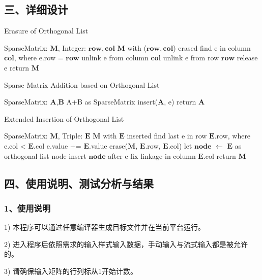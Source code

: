\documentclass[UTF8, a4paper]{ctexart}
\begin{document}
\subsection*{三、详细设计}
\begin{algorithm}[H]
\begin{algorithmic}[1]
\caption{Erasure of Orthogonal List}
\Require SparseMatrix: $\mathbf{M}$, Integer: $\mathbf{row},\mathbf{col}$
\Ensure $\mathbf{M}$ with ($\mathbf{row},\mathbf{col}$) erased
\State find e in column $\mathbf{col}$, where e.row = $\mathbf{row}$
	\State unlink e from column $\mathbf{col}$
	\State unlink e from row $\mathbf{row}$
	\State release e
\EndIf
\State return $\mathbf{M}$
\end{algorithmic}
\end{algorithm}

\begin{algorithm}[H]
\begin{algorithmic}[1]
\caption{Sparse Matrix Addition based on Orthogonal List}
\Require SparseMatrix: $\mathbf{A}$,$\mathbf{B}$
\Ensure A+B as SparseMatrix
	\State insert($\mathbf{A}$, e)
\EndFor
\State return $\mathbf{A}$
\end{algorithmic}
\end{algorithm}

\begin{algorithm}[H]
\begin{algorithmic}[1]
\caption{Extended Insertion of Orthogonal List}
\Require SparseMatrix: $\mathbf{M}$, Triple: $\mathbf{E}$
\Ensure $\mathbf{M}$ with $\mathbf{E}$ inserted
\State find last e in row $\mathbf{E}$.row, where e.col < $\mathbf{E}$.col
	\State e.value += $\mathbf{E}$.value
		\State erase($\mathbf{M}$, $\mathbf{E}$.row, $\mathbf{E}$.col)
	\EndIf
\Else
	\State let $\mathbf{node}$ $\leftarrow$ $\mathbf{E}$ as orthogonal list node
	\State insert $\mathbf{node}$ after e
	\State fix linkage in column $\mathbf{E}$.col
\EndIf
\State return $\mathbf{M}$
\end{algorithmic}
\end{algorithm}

\subsection*{四、使用说明、测试分析与结果}
\subsubsection*{1、使用说明}
1) 本程序可以通过任意编译器生成目标文件并在当前平台运行。 \par
2) 进入程序后依照需求的输入样式输入数据，手动输入与流式输入都是被允许的。 \par
3) 请确保输入矩阵的行列标从1开始计数。 \par
\end{document}
